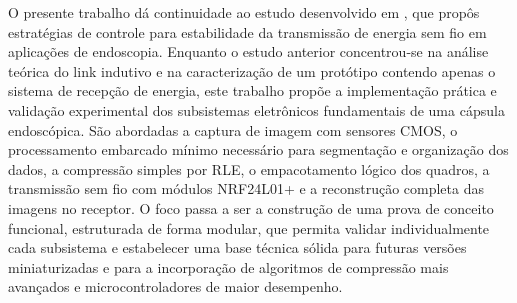 \documentclass[repeatfields,xlists,xpacks,oneside]{ufrgscca}
\begin{document}
O presente trabalho dá continuidade ao estudo desenvolvido em \textcite{murliky2021study}, que propôs estratégias de controle para estabilidade da transmissão de energia sem fio em aplicações de endoscopia. Enquanto o estudo anterior concentrou-se na análise teórica do link indutivo e na caracterização de um protótipo contendo apenas o sistema de recepção de energia, este trabalho propõe a implementação prática e validação experimental dos subsistemas eletrônicos fundamentais de uma cápsula endoscópica. São abordadas a captura de imagem com sensores CMOS, o processamento embarcado mínimo necessário para segmentação e organização dos dados, a compressão simples por RLE, o empacotamento lógico dos quadros, a transmissão sem fio com módulos NRF24L01+ e a reconstrução completa das imagens no receptor. O foco passa a ser a construção de uma prova de conceito funcional, estruturada de forma modular, que permita validar individualmente cada subsistema e estabelecer uma base técnica sólida para futuras versões miniaturizadas e para a incorporação de algoritmos de compressão mais avançados e microcontroladores de maior desempenho.



\end{document}
